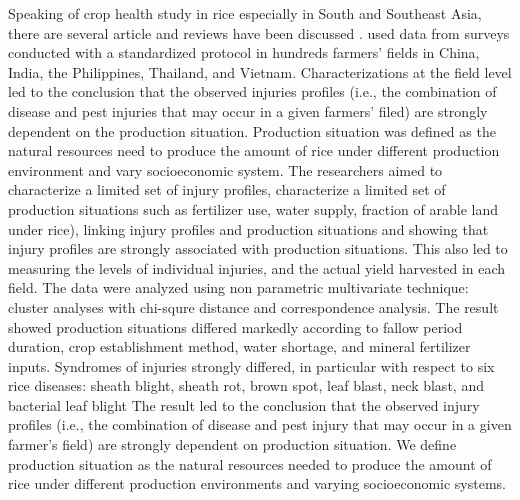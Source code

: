 Speaking of crop health study in rice especially in South and Southeast Asia, there are several article and reviews have been discussed \cite{savary2005multiple, Savary:2006to, Savary:2000vr, reddy2011characterizing, dong2010characterization}. \cite{Savary:2000vr} used data from surveys conducted with a standardized protocol in hundreds farmers’ fields in China, India, the Philippines, Thailand, and Vietnam. Characterizations at the field level led to the conclusion that the observed injuries profiles (i.e., the combination of disease and pest injuries that may occur in a given farmers’ filed) are strongly dependent on the production situation. Production situation was defined as the natural resources need to produce the amount of rice under different production environment and vary socioeconomic system. The researchers aimed to characterize a limited set of injury profiles, characterize a limited set of production situations such as fertilizer use, water supply, fraction of arable land under rice), linking injury profiles and production situations and showing that injury profiles are strongly associated with production situations. This also led to measuring the levels of individual injuries, and the actual yield harvested in each field. The data were analyzed using non parametric multivariate technique: cluster analyses with chi-squre distance and correspondence analysis. The result showed production situations differed markedly according to fallow period duration, crop establishment method, water shortage, and mineral fertilizer inputs. Syndromes of injuries strongly differed, in particular with respect to six rice diseases: sheath blight, sheath rot, brown spot, leaf blast, neck blast, and bacterial leaf blight The result led to the conclusion that the observed injury profiles (i.e., the combination of disease and pest injury that may occur in a given farmer’s field) are strongly dependent on production situation. We define production situation as the natural resources needed to produce the amount of rice under different production environments and varying socioeconomic systems.

